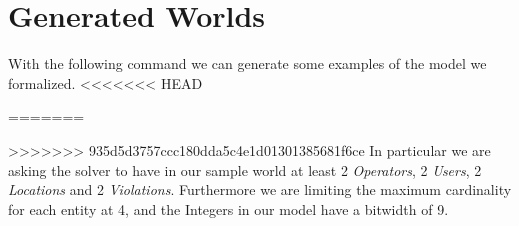 \section{Generated Worlds}
With the following command we can generate some examples of the model we 
formalized.
<<<<<<< HEAD

=======

>>>>>>> 935d5d3757ccc180dda5c4e1d01301385681f6ce
In particular we are asking the solver to have in our sample world at least 2
\emph{Operators}, 2 \emph{Users}, 2 \emph{Locations} and 2 \emph{Violations}.
Furthermore we are limiting the maximum cardinality for each entity at 4, and
the Integers in our model have a bitwidth of 9.